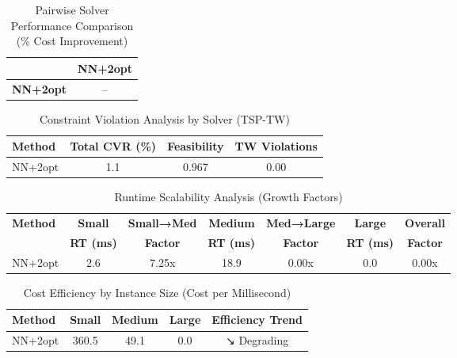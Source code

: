 
\begin{table}[ht]
\centering
\caption{Pairwise Solver Performance Comparison (\% Cost Improvement)}
\label{tab:pairwise_comparison}
\begin{tabular}{lc}
\toprule
 & \textbf{NN+2opt} \\
\midrule
\textbf{NN+2opt} & -- \\
\bottomrule
\end{tabular}
\end{table}

\begin{table}[ht]
\centering
\caption{Constraint Violation Analysis by Solver (TSP-TW)}
\label{tab:constraint_violations}
\begin{tabular}{lccc}
\toprule
\textbf{Method} & \textbf{Total CVR (\%)} & \textbf{Feasibility} & \textbf{TW Violations} \\
\midrule
NN+2opt & 1.1 & 0.967 & 0.00 \\
\bottomrule
\end{tabular}
\end{table}


\begin{table}[ht]
\centering
\caption{Runtime Scalability Analysis (Growth Factors)}
\label{tab:runtime_scalability}
\begin{tabular}{lcccccc}
\toprule
\textbf{Method} & \textbf{Small} & \textbf{Small→Med} & \textbf{Medium} & \textbf{Med→Large} & \textbf{Large} & \textbf{Overall} \\
\textbf{} & \textbf{RT (ms)} & \textbf{Factor} & \textbf{RT (ms)} & \textbf{Factor} & \textbf{RT (ms)} & \textbf{Factor} \\
\midrule
NN+2opt & 2.6 & 7.25x & 18.9 & 0.00x & 0.0 & 0.00x \\
\bottomrule
\end{tabular}
\end{table}

\begin{table}[ht]
\centering
\caption{Cost Efficiency by Instance Size (Cost per Millisecond)}
\label{tab:cost_efficiency}
\begin{tabular}{lcccc}
\toprule
\textbf{Method} & \textbf{Small} & \textbf{Medium} & \textbf{Large} & \textbf{Efficiency Trend} \\
\midrule
NN+2opt & 360.5 & 49.1 & 0.0 & ↘ Degrading \\
\bottomrule
\end{tabular}
\end{table}

